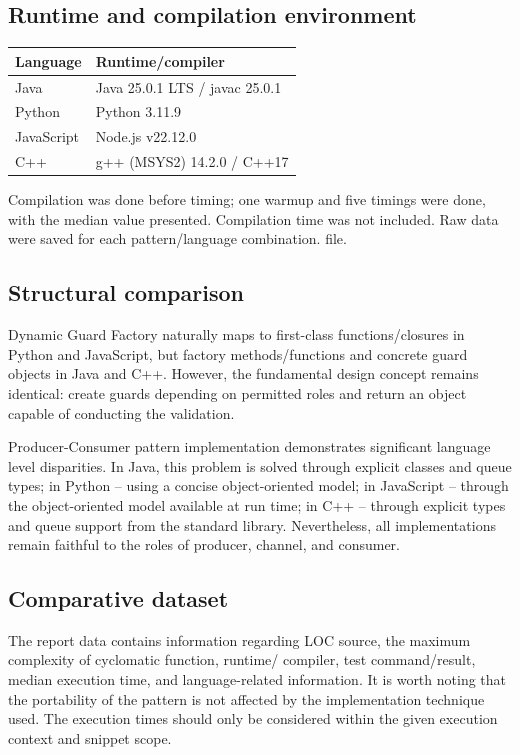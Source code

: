 \documentclass[11pt,a4paper]{article}
\newcommand{\code}[1]{\texttt{\small\detokenize{#1}}}
\begin{document}
\subsection{Runtime and compilation environment}
\begin{tabularx}{\linewidth}{@{}lY@{}}
\toprule
Language & Runtime/compiler\\
\midrule
Java & Java 25.0.1 LTS / javac 25.0.1\\
Python & Python 3.11.9\\
JavaScript & Node.js v22.12.0\\
C++ & g++ (MSYS2) 14.2.0 / C++17\\
\bottomrule
\end{tabularx}

Compilation was done before timing; one warmup and five timings were done, with the median value presented. Compilation time was not included. Raw data were saved for each pattern/language combination.
\code{timing_raw.csv} file.

\subsection{Structural comparison}
Dynamic Guard Factory naturally maps to first-class functions/closures in Python and JavaScript, but factory methods/functions and concrete guard objects in Java and C++. However, the fundamental design concept remains identical: create guards depending on permitted roles and return an object capable of conducting the validation.

Producer-Consumer pattern implementation demonstrates significant language level disparities. In Java, this problem is solved through explicit classes and queue types; in Python – using a concise object-oriented model; in JavaScript – through the object-oriented model available at run time; in C++ – through explicit types and queue support from the standard library. Nevertheless, all implementations remain faithful to the roles of producer, channel, and consumer.

\subsection{Comparative dataset}
The report data contains information regarding LOC source, the maximum complexity of cyclomatic function, runtime/ compiler, test command/result, median execution time, and language-related information. It is worth noting that the portability of the pattern is not affected by the implementation technique used. The execution times should only be considered within the given execution context and snippet scope.
\end{document}
